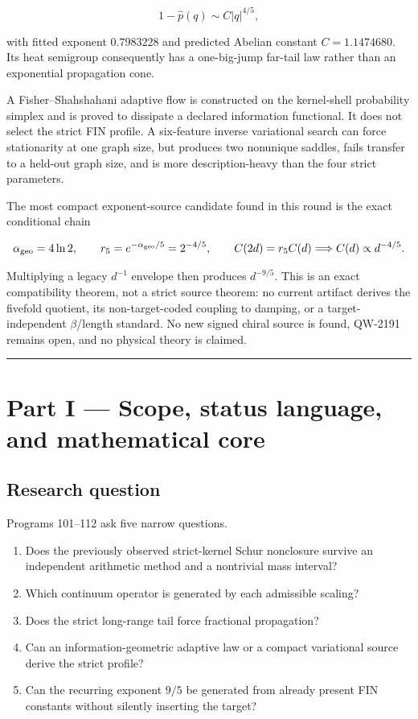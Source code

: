 \documentclass[11pt,a4paper,openany]{report}
\begin{document}
\[
1-\widehat p(q)\sim C|q|^{4/5},
\]

with fitted exponent \(0.7983228\) and predicted Abelian constant \(C=1.1474680\). Its heat semigroup consequently has a one-big-jump far-tail law rather than an exponential propagation cone.

A Fisher--Shahshahani adaptive flow is constructed on the kernel-shell probability simplex and is proved to dissipate a declared information functional. It does not select the strict FIN profile. A six-feature inverse variational search can force stationarity at one graph size, but produces two nonunique saddles, fails transfer to a held-out graph size, and is more description-heavy than the four strict parameters.

The most compact exponent-source candidate found in this round is the exact conditional chain

\[
\alpha_{\rm geo}=4\ln2,\qquad
r_5=e^{-\alpha_{\rm geo}/5}=2^{-4/5},
\qquad
C(2d)=r_5C(d)
\Longrightarrow
C(d)\propto d^{-4/5}.
\]

Multiplying a legacy \(d^{-1}\) envelope then produces \(d^{-9/5}\). This is an exact compatibility theorem, not a strict source theorem: no current artifact derives the fivefold quotient, its non-target-coded coupling to damping, or a target-independent \(\beta\)/\allowbreak{}length standard. No new signed chiral source is found, QW-2191 remains open, and no physical theory is claimed.

\par\medskip\hrule\medskip

\chapter{Part I --- Scope, status language, and mathematical core}

\section{Research question}

Programs 101--112 ask five narrow questions.

\begin{enumerate}
\item 
Does the previously observed strict-kernel Schur nonclosure survive an independent arithmetic method and a nontrivial mass interval?

\item 
Which continuum operator is generated by each admissible scaling?

\item 
Does the strict long-range tail force fractional propagation?

\item 
Can an information-geometric adaptive law or a compact variational source derive the strict profile?

\item 
Can the recurring exponent \(9/5\) be generated from already present FIN constants without silently inserting the target?

\end{enumerate}
\end{document}
